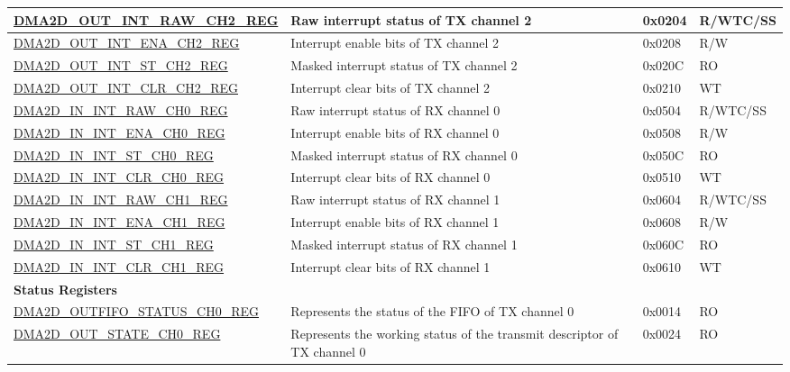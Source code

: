 \begin{longtable}{ | p{7cm} | p{11.5cm} | p{1.3cm} | p{2cm} | }
\hyperref[regdesc:DMA2DOUTINTRAWCHNREG]{DMA2D\_OUT\_INT\_RAW\_CH2\_REG} & Raw interrupt status of TX channel 2 & 0x0204 & R/WTC/SS \\ \hline
\hyperref[regdesc:DMA2DOUTINTENACHNREG]{DMA2D\_OUT\_INT\_ENA\_CH2\_REG} & Interrupt enable bits of TX channel 2 & 0x0208 & R/W \\ \hline
\hyperref[regdesc:DMA2DOUTINTSTCHNREG]{DMA2D\_OUT\_INT\_ST\_CH2\_REG} & Masked interrupt status of TX channel 2 & 0x020C & RO \\ \hline
\hyperref[regdesc:DMA2DOUTINTCLRCHNREG]{DMA2D\_OUT\_INT\_CLR\_CH2\_REG} & Interrupt clear bits of TX channel 2 & 0x0210 & WT \\ \hline
\hyperref[regdesc:DMA2DININTRAWCHNREG]{DMA2D\_IN\_INT\_RAW\_CH0\_REG} & Raw interrupt status of RX channel 0 & 0x0504 & R/WTC/SS \\ \hline
\hyperref[regdesc:DMA2DININTENACHNREG]{DMA2D\_IN\_INT\_ENA\_CH0\_REG} & Interrupt enable bits of RX channel 0 & 0x0508 & R/W \\ \hline
\hyperref[regdesc:DMA2DININTSTCHNREG]{DMA2D\_IN\_INT\_ST\_CH0\_REG} & Masked interrupt status of RX channel 0 & 0x050C & RO \\ \hline
\hyperref[regdesc:DMA2DININTCLRCHNREG]{DMA2D\_IN\_INT\_CLR\_CH0\_REG} & Interrupt clear bits of RX channel 0 & 0x0510 & WT \\ \hline
\hyperref[regdesc:DMA2DININTRAWCHNREG]{DMA2D\_IN\_INT\_RAW\_CH1\_REG} & Raw interrupt status of RX channel 1 & 0x0604 & R/WTC/SS \\ \hline
\hyperref[regdesc:DMA2DININTENACHNREG]{DMA2D\_IN\_INT\_ENA\_CH1\_REG} & Interrupt enable bits of RX channel 1 & 0x0608 & R/W \\ \hline
\hyperref[regdesc:DMA2DININTSTCHNREG]{DMA2D\_IN\_INT\_ST\_CH1\_REG} & Masked interrupt status of RX channel 1 & 0x060C & RO \\ \hline
\hyperref[regdesc:DMA2DININTCLRCHNREG]{DMA2D\_IN\_INT\_CLR\_CH1\_REG} & Interrupt clear bits of RX channel 1 & 0x0610 & WT \\ \hline
\multicolumn{4}{|l|}{\textbf{Status Registers}} \\ \hline
\hyperref[regdesc:DMA2DOUTFIFOSTATUSCHNREG]{DMA2D\_OUTFIFO\_STATUS\_CH0\_REG} & Represents the status of the FIFO of TX channel 0 & 0x0014 & RO \\ \hline
\hyperref[regdesc:DMA2DOUTSTATECHNREG]{DMA2D\_OUT\_STATE\_CH0\_REG} & Represents the working status of the transmit descriptor of TX channel 0 & 0x0024 & RO \\ \hline

\end{longtable}

